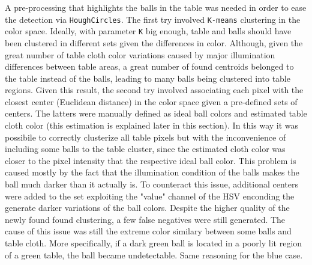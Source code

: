 A pre-processing that highlights the balls in the table was needed in order to ease the detection via \verb|HoughCircles|.
The first try involved \verb|K-means| clustering in the color space. Ideally, with parameter \verb|K| big enough, table and balls should have been
clustered in different sets given the differences in color. Although, given the great number of table cloth color variations caused by major illumination
differences between table areas, a great number of found centroids belonged to the table instead of the balls, leading to many balls being clustered
into table regions. Given this result, the second try involved associating each pixel with the closest center (Euclidean distance) in the color space given a pre-defined sets of centers.
The latters were manually defined as ideal ball colors and estimated table cloth color (this estimation is explained later in this section).
In this way it was possibile to correctly clusterize all table pixels but with the inconvenience of including some balls to the table cluster, since the estimated
cloth color was closer to the pixel intensity that the respective ideal ball color. This problem is caused mostly by the fact that the illumination condition of the balls
makes the ball much darker than it actually is. To counteract this issue, additional centers were added to the set exploiting the "value" channel of the HSV enconding
the generate darker variations of the ball colors. Despite the higher quality of the newly found found clustering, a few false negatives were still generated.
The cause of this issue was still the extreme color similary between some balls and table cloth. More specifically, if a dark green ball is located in a poorly lit 
region of a green table, the ball became undetectable. Same reasoning for the blue case.

